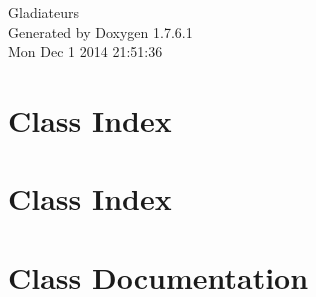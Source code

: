 \documentclass[a4paper]{book}
\begin{document}
\hypersetup{pageanchor=false,citecolor=blue}
\begin{titlepage}
\vspace*{7cm}
\begin{center}
{\Large \-Gladiateurs }\\
\vspace*{1cm}
{\large \-Generated by Doxygen 1.7.6.1}\\
\vspace*{0.5cm}
{\small Mon Dec 1 2014 21:51:36}\\
\end{center}
\end{titlepage}
\clearemptydoublepage
{}
\tableofcontents
\clearemptydoublepage
{}
\hypersetup{pageanchor=true,citecolor=blue}
\chapter{\-Class \-Index}

\chapter{\-Class \-Index}

\chapter{\-Class \-Documentation}



































\printindex
\end{document}
